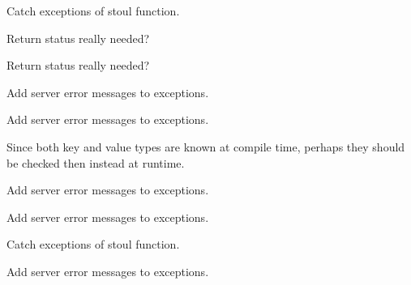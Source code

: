 \begin{DoxyRefList}
Catch exceptions of {\ttfamily stoul} function. 
\item[Member \mbox{\hyperlink{classmailio_1_1imap_ad037023bdadb3a454094f31f8e71bd26}{mailio::imap::rename\+\_\+folder}} (const std\+::string \&old\+\_\+name, const std\+::string \&new\+\_\+name)]\label{todo__todo000021}%
%
Return status really needed? 
\item[Member \mbox{\hyperlink{classmailio_1_1imap_a7b8ade149f0a82ed54b0890d9d821fb7}{mailio::imap::rename\+\_\+folder}} (const std\+::list$<$ std\+::string $>$ \&old\+\_\+name, const std\+::list$<$ std\+::string $>$ \&new\+\_\+name)]\label{todo__todo000022}%
%
Return status really needed? 
\item[Member \mbox{\hyperlink{classmailio_1_1imap_a5269ed06e177d775d43ad8c5780577fe}{mailio::imap::search}} (const std\+::list$<$ search\+\_\+condition\+\_\+t $>$ \&conditions, std\+::list$<$ unsigned long $>$ \&results, bool want\+\_\+uids=false)]\label{todo__todo000016}%
%
Add server error messages to exceptions. 
\item[Member \mbox{\hyperlink{classmailio_1_1imap_a5ba26b824d9b8be809f408ee0e22d920}{mailio::imap::search}} (const std\+::string \&conditions, std\+::list$<$ unsigned long $>$ \&results, bool want\+\_\+uids=false)]\label{todo__todo000025}%
%
Add server error messages to exceptions. 
\item[Class \mbox{\hyperlink{structmailio_1_1imap_1_1search__condition__t}{mailio::imap::search\+\_\+condition\+\_\+t}} ]\label{todo__todo000006}%
%
Since both key and value types are known at compile time, perhaps they should be checked then instead at runtime. 
\item[Member \mbox{\hyperlink{classmailio_1_1imap_a5df2d8c910831f5abd910b93eab611f2}{mailio::imap::select}} (const std\+::string \&mailbox, bool read\+\_\+only=false)]\label{todo__todo000008}%
%
Add server error messages to exceptions. 
\item[Member \mbox{\hyperlink{classmailio_1_1imap_a45cc1824fe6b1576588d50f38bdbaae1}{mailio::imap::select}} (const std\+::list$<$ std\+::string $>$ \&folder\+\_\+name, bool read\+\_\+only=false)]\label{todo__todo000007}%
%
Add server error messages to exceptions. 

Catch exceptions of {\ttfamily stoul} function. 
\item[Member \mbox{\hyperlink{classmailio_1_1imap_ab242ee70e15cf2b2dc2064cb467e6f0a}{mailio::imap::statistics}} (const std\+::string \&mailbox, unsigned int info=mailbox\+\_\+stat\+\_\+t\+::\+D\+E\+F\+A\+U\+LT)]\label{todo__todo000012}%
%
Add server error messages to exceptions. 


\end{DoxyRefList}

